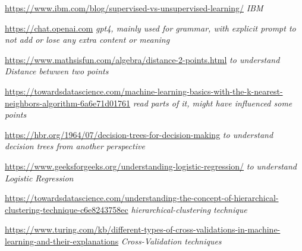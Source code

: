 \documentclass[11pt]{article}
\begin{document}
\newpage
\begin{thebibliography}{1}
  \url{https://www.ibm.com/blog/supervised-vs-unsupervised-learning/}
  \textit{IBM}

  \url{https://chat.openai.com}
  \textit{gpt4, mainly used for grammar, with explicit prompt to not add or lose any extra content or meaning}

  \url{https://www.mathsisfun.com/algebra/distance-2-points.html}
  \textit{to understand Distance betwwen two points}

  \url{https://towardsdatascience.com/machine-learning-basics-with-the-k-nearest-neighbors-algorithm-6a6e71d01761}
  \textit{read parts of it, might have influenced some points}

  \url{https://hbr.org/1964/07/decision-trees-for-decision-making}
  \textit{to understand decision trees from another perspective}

  \url{https://www.geeksforgeeks.org/understanding-logistic-regression/}
  \textit{to understand Logistic Regression}

  \url{https://towardsdatascience.com/understanding-the-concept-of-hierarchical-clustering-technique-c6e8243758ec}
  \textit{hierarchical-clustering technique}

  \url{https://www.turing.com/kb/different-types-of-cross-validations-in-machine-learning-and-their-explanations}
  \textit{Cross-Validation techniques}

\end{thebibliography}
\end{document}
